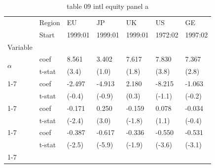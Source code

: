 \begin{table}[htbp]
  \centering
  \caption{table 09 intl equity panel a}
  \label{tab:table_09_intl_equity_panel_a}
  \begin{tabular}{lllllll}
\toprule
 & Region & EU & JP & UK & US & GE \\
 & Start & 1999:01 & 1999:01 & 1999:01 & 1972:02 & 1997:02 \\
Variable &  &  &  &  &  &  \\
\midrule
\multirow[t]{2}{*}{$\alpha$} & coef & 8.561 & 3.402 & 7.617 & 7.830 & 7.367 \\
 & t-stat & (3.4) & (1.0) & (1.8) & (3.8) & (2.8) \\
\cline{1-7}
\multirow[t]{2}{*}{$I_B$} & coef & -2.497 & -4.913 & 2.180 & -8.215 & -1.063 \\
 & t-stat & (-0.4) & (-0.9) & (0.3) & (-1.1) & (-0.2) \\
\cline{1-7}
\multirow[t]{2}{*}{$R^e_m$} & coef & -0.171 & 0.250 & -0.159 & 0.078 & -0.034 \\
 & t-stat & (-2.4) & (3.0) & (-1.8) & (1.1) & (-0.4) \\
\cline{1-7}
\multirow[t]{2}{*}{$I_B R^e_m$} & coef & -0.387 & -0.617 & -0.336 & -0.550 & -0.531 \\
 & t-stat & (-2.5) & (-5.9) & (-1.9) & (-3.6) & (-3.1) \\
\cline{1-7}
\bottomrule
\end{tabular}

\end{table}
